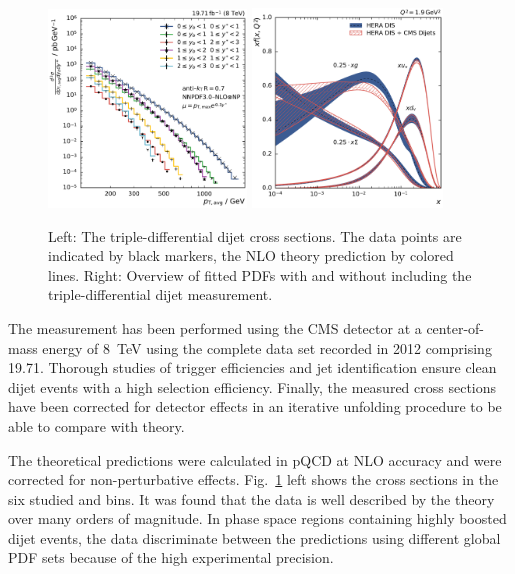 \begin{figure}[h!tbp]
    \centering
    \includegraphics[width=0.47\textwidth]{figures/measurement/ptavg_spectrum.pdf}\hfill
    \includegraphics[width=0.45\textwidth]{figures/pdf_constraints/pdfcomp_direct_overview_1.9.pdf}
    \caption[Summary plot of results]{Left:
    The triple-differential dijet cross sections. The data points are indicated by black
    markers, the NLO theory prediction by colored lines. Right: Overview of
    fitted PDFs with and without including the triple-differential dijet
    measurement.}
    \label{fig:conclusion}
\end{figure}

The measurement has been performed using the CMS detector at a center-of-mass
energy of \SI{8}{\TeV} using the complete data set recorded in 2012 comprising
\SI{19.71}{\fbinv}. Thorough studies of trigger efficiencies and jet
identification ensure clean dijet events with a high selection efficiency.
Finally, the measured cross sections have been corrected for detector effects in
an iterative unfolding procedure to be able to compare with theory.

The theoretical predictions were calculated in pQCD at NLO accuracy and were
corrected for non-perturbative effects. Fig.~\ref{fig:conclusion} left shows the
cross sections in the six studied \ystar and \yboost bins. It was found that the
data is well described by the theory over many orders of magnitude. In
phase space regions containing highly boosted dijet events, the data
discriminate between the predictions using different global PDF sets because of
the high experimental precision.

